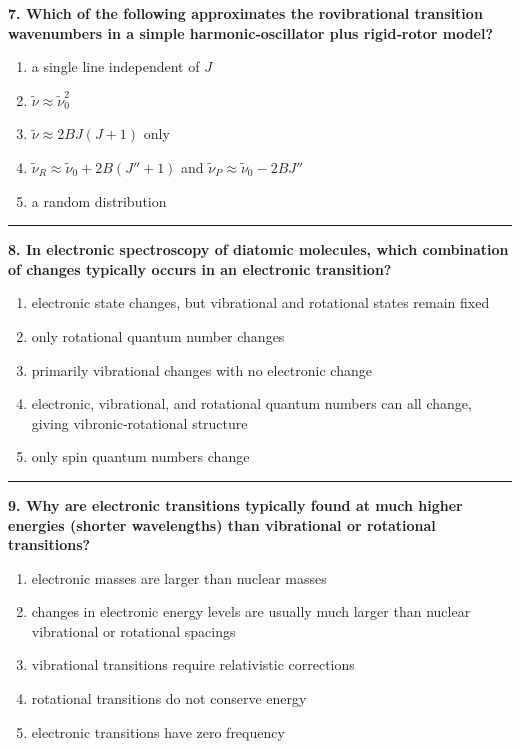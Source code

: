 \documentclass[
  english,
  9pt,
]{extbook}
\providecommand{\tightlist}{%
  \setlength{\itemsep}{0pt}\setlength{\parskip}{0pt}}
\theoremstyle{definition}
\theoremstyle{definition}
\theoremstyle{definition}
\theoremstyle{definition}
\theoremstyle{remark}
\begin{document}
\textbf{7. Which of the following approximates the rovibrational transition wavenumbers in a simple harmonic‑oscillator plus rigid‑rotor model?}

\begin{enumerate}
\def\labelenumi{\alph{enumi}.}
\tightlist
\item
  a single line independent of \(J\)
\item
  \(\tilde{\nu} \approx \tilde{\nu}_0^2\)
\item
  \(\tilde{\nu} \approx 2BJ(J+1)\) only
\item
  \(\tilde{\nu}_R \approx \tilde{\nu}_0 + 2B(J''+1)\) and \(\tilde{\nu}_P \approx \tilde{\nu}_0 - 2BJ''\)
\item
  a random distribution
\end{enumerate}

\begin{center}\rule{0.5\linewidth}{0.5pt}\end{center}

\textbf{8. In electronic spectroscopy of diatomic molecules, which combination of changes typically occurs in an electronic transition?}

\begin{enumerate}
\def\labelenumi{\alph{enumi}.}
\tightlist
\item
  electronic state changes, but vibrational and rotational states remain fixed
\item
  only rotational quantum number changes
\item
  primarily vibrational changes with no electronic change
\item
  electronic, vibrational, and rotational quantum numbers can all change, giving vibronic‑rotational structure
\item
  only spin quantum numbers change
\end{enumerate}

\begin{center}\rule{0.5\linewidth}{0.5pt}\end{center}

\textbf{9. Why are electronic transitions typically found at much higher energies (shorter wavelengths) than vibrational or rotational transitions?}

\begin{enumerate}
\def\labelenumi{\alph{enumi}.}
\tightlist
\item
  electronic masses are larger than nuclear masses
\item
  changes in electronic energy levels are usually much larger than nuclear vibrational or rotational spacings
\item
  vibrational transitions require relativistic corrections
\item
  rotational transitions do not conserve energy
\item
  electronic transitions have zero frequency
\end{enumerate}
\end{document}
